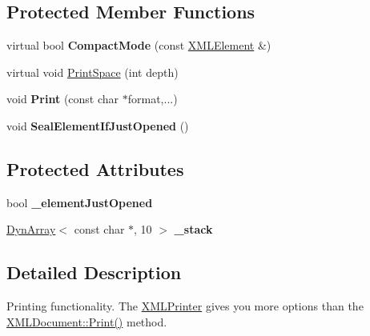 \subsection*{Protected Member Functions}
\begin{DoxyCompactItemize}
\item 
virtual bool {\bfseries Compact\+Mode} (const \hyperlink{classtinyxml2_1_1_x_m_l_element}{X\+M\+L\+Element} \&)\hypertarget{classtinyxml2_1_1_x_m_l_printer_a38e1ed5a779bdf63eda9e808f7a6de66}{}\label{classtinyxml2_1_1_x_m_l_printer_a38e1ed5a779bdf63eda9e808f7a6de66}

\item 
virtual void \hyperlink{classtinyxml2_1_1_x_m_l_printer_a1c4b2ccbe4fdb316d54f5a93f3559260}{Print\+Space} (int depth)
\item 
void {\bfseries Print} (const char $\ast$format,...)\hypertarget{classtinyxml2_1_1_x_m_l_printer_ab30210a7f32e45634e7a45137bf6fdf6}{}\label{classtinyxml2_1_1_x_m_l_printer_ab30210a7f32e45634e7a45137bf6fdf6}

\item 
void {\bfseries Seal\+Element\+If\+Just\+Opened} ()\hypertarget{classtinyxml2_1_1_x_m_l_printer_ac6e2c72c5d796f5b4de6ce81ca95e3fa}{}\label{classtinyxml2_1_1_x_m_l_printer_ac6e2c72c5d796f5b4de6ce81ca95e3fa}

\end{DoxyCompactItemize}
\subsection*{Protected Attributes}
\begin{DoxyCompactItemize}
\item 
bool {\bfseries \+\_\+element\+Just\+Opened}\hypertarget{classtinyxml2_1_1_x_m_l_printer_ac07169d58b465214a2b1fa306e617c26}{}\label{classtinyxml2_1_1_x_m_l_printer_ac07169d58b465214a2b1fa306e617c26}

\item 
\hyperlink{classtinyxml2_1_1_dyn_array}{Dyn\+Array}$<$ const char $\ast$, 10 $>$ {\bfseries \+\_\+stack}\hypertarget{classtinyxml2_1_1_x_m_l_printer_a99d59e67e084714541bee3ae43884bef}{}\label{classtinyxml2_1_1_x_m_l_printer_a99d59e67e084714541bee3ae43884bef}

\end{DoxyCompactItemize}


\subsection{Detailed Description}
Printing functionality. The \hyperlink{classtinyxml2_1_1_x_m_l_printer}{X\+M\+L\+Printer} gives you more options than the \hyperlink{classtinyxml2_1_1_x_m_l_document_a686ea28672c0e0c60383ec28148c1ac0}{X\+M\+L\+Document\+::\+Print()} method.

